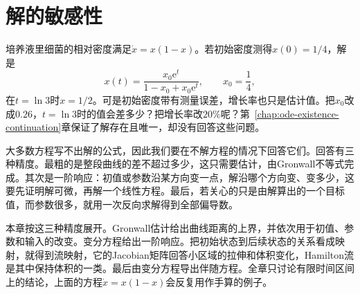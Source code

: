 \chapter{解的敏感性}
\label{chap:ode-sensitivity}

培养液里细菌的相对密度满足$\dot{x}=x(1-x)$。若初始密度测得$x(0)=1/4$，解是
\[
 x(t)=\frac{x_0\mathrm{e}^{t}}{1-x_0+x_0\mathrm{e}^{t}},\qquad x_0=\frac14,
\]
在$t=\ln3$时$x=1/2$。可是初始密度带有测量误差，增长率也只是估计值。把$x_0$改成$0.26$，$t=\ln3$时的值会差多少？把增长率改$20\%$呢？第~\ref{chap:ode-existence-continuation}章保证了解存在且唯一，却没有回答这些问题。

大多数方程写不出解的公式，因此我们要在不解方程的情况下回答它们。回答有三种精度。最粗的是整段曲线的差不超过多少，这只需要估计，由Gronwall不等式完成。其次是一阶响应：初值或参数沿某方向变一点，解沿哪个方向变、变多少，这要先证明解可微，再解一个线性方程。最后，若关心的只是由解算出的一个目标值，而参数很多，就用一次反向求解得到全部偏导数。

本章按这三种精度展开。Gronwall估计给出曲线距离的上界，并依次用于初值、参数和输入的改变。变分方程给出一阶响应。把初始状态到后续状态的关系看成映射，就得到流映射，它的Jacobian矩阵回答小区域的拉伸和体积变化，Hamilton流是其中保持体积的一类。最后由变分方程导出伴随方程。全章只讨论有限时间区间上的结论，上面的方程$\dot{x}=x(1-x)$会反复用作手算的例子。









